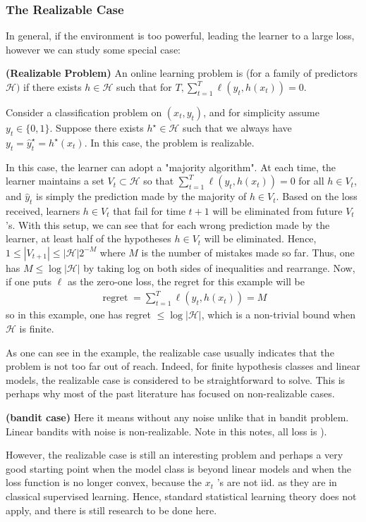 \documentclass{article}
\newcommand{\bfs}[1]{\textbf{({#1}) }}
\newcommand{\re}{\operatorname{regret}}
\begin{document}
\subsubsection{The Realizable Case}
In general, if the environment is too powerful, leading the learner to a large loss,  however we can study some special case:
\begin{defa}\bfs{Realizable Problem}
An online learning problem is  (for a family of predictors $\mathcal{H})$ if there exists $h \in \mathcal{H}$ such that for  $T, \sum_{t=1}^{T} \ell\left(y_{t}, h\left(x_{t}\right)\right)=0$.
\end{defa} 
\begin{exma}
 Consider a classification problem on $\left(x_{t}, y_{t}\right)$, and for simplicity assume $y_{t} \in\{0,1\} .$ Suppose there exists $h^{\star} \in \mathcal{H}$ such that we always have $y_{t}=\hat{y}_{t}^{\star}=h^{\star}\left(x_{t}\right) .$ In this case, the problem is realizable.

In this case, the learner can adopt a "majority algorithm". At each time, the learner maintains a set $V_{t} \subset \mathcal{H}$ so that $\sum_{t=1}^{T} \ell\left(y_{t}, h\left(x_{t}\right)\right)=0$ for all $h \in V_{t}$, and $\hat{y}_{t}$ is simply the prediction made by the majority of $h \in V_{t} .$ Based on the loss received, learners $h \in V_{t}$ that fail for time $t+1$ will be eliminated from future $V_{t}$ 's.
With this setup, we can see that for each wrong prediction made by the learner, at least half of the hypotheses $h \in V_{t}$ will be eliminated. Hence, $1 \leq\left|V_{t+1}\right| \leq|\mathcal{H}| 2^{-M}$ where $M$ is the number of mistakes made so far. Thus, one has $M \leq \log |\mathcal{H}|$ by taking log on both sides of inequalities and rearrange.
Now, if one puts $\ell$ as the zero-one loss, the regret for this example will be
\begin{align*}
\re=\sum_{t=1}^{T} \ell\left(y_{t}, h\left(x_{t}\right)\right)=M
\end{align*}
so in this example, one has regret $\leq \log |\mathcal{H}|$, which is a non-trivial bound when $\mathcal{H}$ is finite.
\end{exma}

As one can see in the example, the realizable case usually indicates that the problem is not too far out of reach. Indeed, for finite hypothesis classes and linear models, the realizable case is considered to be straightforward to solve. This is perhaps why most of the past literature has focused on non-realizable cases. 
\begin{rema}\bfs{bandit case}
Here it means without any noise  unlike that in bandit problem. Linear bandits with noise is non-realizable. Note in this notes, all loss is ). 
\end{rema}
However, the realizable case is still an interesting problem and perhaps a very good starting point when the model class is beyond linear models and when the loss function is no longer convex, because the $x_{t}$ 's are not \gls{iid}. as they are in classical supervised learning. Hence, standard statistical learning theory does not apply, and there is still research to be done here.
\end{document}
